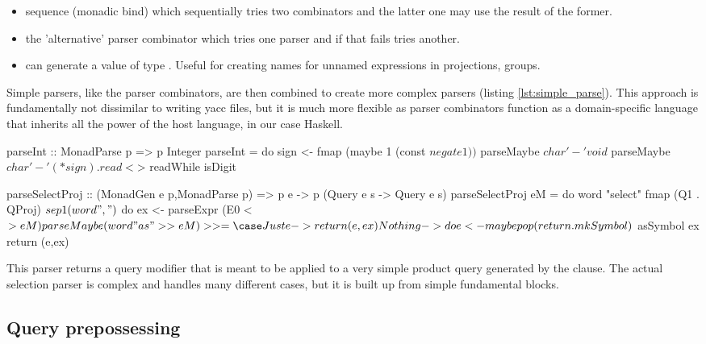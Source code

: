 \begin{itemize}
\item sequence (monadic bind)  which sequentially tries two combinators and the latter one may
  use the result of the former.
\item the 'alternative' parser combinator  which tries one parser and if that fails tries another.
\item {} can generate a value of type . Useful for creating names for unnamed expressions in
  projections, groups.
\end{itemize}

Simple parsers, like the  parser combinators, are then
combined to create more complex parsers (listing
\ref{lst:simple_parse}). This approach is fundamentally not dissimilar
to writing yacc files, but it is much more flexible as parser
combinators function as a domain-specific language that inherits all
the power of the host language, in our case Haskell.

\begin{code}
  \begin{haskellcode}
    parseInt :: MonadParse p => p Integer
    parseInt = do
      sign <- fmap (maybe 1 (const $ negate 1)) $ parseMaybe $ char '-'
      void $ parseMaybe $ char '-'
      (* sign) . read <$> readWhile isDigit

    parseSelectProj
      :: (MonadGen e p,MonadParse p)
      => p e -> p (Query e s -> Query e s)
    parseSelectProj eM = do
      word "select"
      fmap (Q1 . QProj) $ sep1 (word ",") $ do
      ex <- parseExpr (E0 <$> eM)
      parseMaybe (word "as" >> eM) >>= \case
        Just e -> return (e,ex)
        Nothing -> do
      e <- maybe pop (return . mkSymbol) $ asSymbol ex
      return (e,ex)
  \end{haskellcode}
  \caption{\label{lst:simple_parse}This parser returns a query
    modifier that is meant to be applied to a very simple product
    query generated by the  clause. The actual selection
    parser is complex and handles many different cases, but it is
    built up from simple fundamental blocks.}
\end{code}

\subsection{Query prepossessing}

